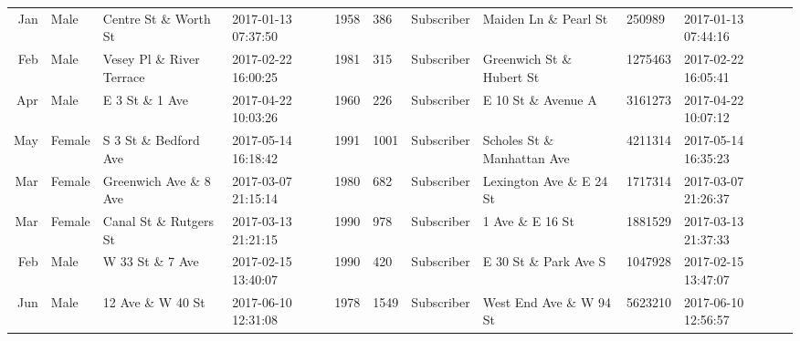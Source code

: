 \documentclass[11pt]{article}
\begin{document}
\begin{tabular}{r|llllllllll}
	 Jan                           & Male                          & Centre St \& Worth St        & 2017-01-13 07:37:50           & 1958                          &  386                          & Subscriber                    & Maiden Ln \& Pearl St        &  250989                       & 2017-01-13 07:44:16          \\
	 Feb                           & Male                          & Vesey Pl \& River Terrace    & 2017-02-22 16:00:25           & 1981                          &  315                          & Subscriber                    & Greenwich St \& Hubert St    & 1275463                       & 2017-02-22 16:05:41          \\
	 Apr                           & Male                          & E 3 St \& 1 Ave              & 2017-04-22 10:03:26           & 1960                          &  226                          & Subscriber                    & E 10 St \& Avenue A          & 3161273                       & 2017-04-22 10:07:12          \\
	 May                           & Female                        & S 3 St \& Bedford Ave        & 2017-05-14 16:18:42           & 1991                          & 1001                          & Subscriber                    & Scholes St \& Manhattan Ave  & 4211314                       & 2017-05-14 16:35:23          \\
	 Mar                           & Female                        & Greenwich Ave \& 8 Ave       & 2017-03-07 21:15:14           & 1980                          &  682                          & Subscriber                    & Lexington Ave \& E 24 St     & 1717314                       & 2017-03-07 21:26:37          \\
	 Mar                           & Female                        & Canal St \& Rutgers St       & 2017-03-13 21:21:15           & 1990                          &  978                          & Subscriber                    & 1 Ave \& E 16 St             & 1881529                       & 2017-03-13 21:37:33          \\
	 Feb                           & Male                          & W 33 St \& 7 Ave             & 2017-02-15 13:40:07           & 1990                          &  420                          & Subscriber                    & E 30 St \& Park Ave S        & 1047928                       & 2017-02-15 13:47:07          \\
	 Jun                           & Male                          & 12 Ave \& W 40 St            & 2017-06-10 12:31:08           & 1978                          & 1549                          & Subscriber                    & West End Ave \& W 94 St      & 5623210                       & 2017-06-10 12:56:57          \\

\end{tabular}
\end{document}
